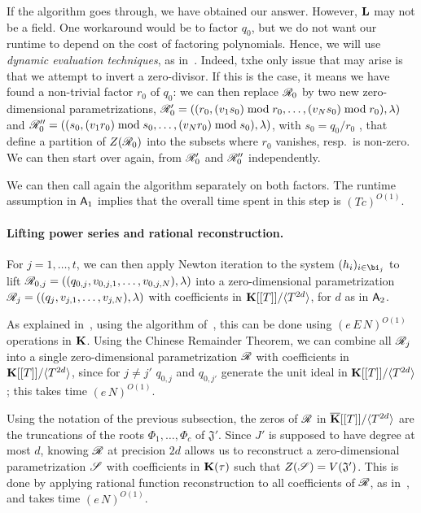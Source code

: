 \documentclass[12pt]{article}
\begin{document}
If the algorithm goes through, we have obtained our answer. However,
$\mathbf{L}$ may not be a field.  One workaround would be to factor $q_0$,
but we do not want our runtime to depend on the cost of factoring
polynomials. Hence, we will use {\em dynamic evaluation techniques},
as in~\cite{D5}. Indeed, txhe only issue that may arise is that we attempt to invert a
zero-divisor. If this is the case, it means we have found a
non-trivial factor $r_0$ of $q_0$: we can then replace $\mathscr{R}_0$ by
two new zero-dimensional parametrizations, $\mathscr{R}'_0=((r_0,(v_1 s_0)
\bmod r_0,\dots,(v_N s_0)\bmod r_0),\lambda)$ and $\mathscr{R}''_0=((s_0,(v_1 r_0)
\bmod s_0,\dots,(v_N r_0)\bmod s_0),\lambda)$, with $s_0=q_0/r_0$
, that define a partition of
$Z(\mathscr{R}_0)$ into the subsets where $r_0$ vanishes, resp.\ is
non-zero. We can then start over again, from $\mathscr{R}'_0$ and
$\mathscr{R}''_0$ independently.

We can then call again the algorithm separately on both factors. The
runtime assumption in ${\sf A}_1$ implies that the overall time spent
in this step is $(T c)^{O(1)}$.

\paragraph{Lifting power series and rational reconstruction.}
For $j=1,\dots,t$, we can then apply Newton iteration to the system
$(h_i)_{i \in \bi_j}$ to lift
$\mathscr{R}_{0,j}=((q_{0,j},v_{0,j,1},\dots,v_{0,j,N}),\lambda)$ into a
zero-dimensional parametrization
$\mathscr{R}_{j}=((q_{j},v_{j,1},\dots,v_{j,N}),\lambda)$ with coefficients
in $\mathbf{K}[[T]]/\langle T^{2d}\rangle$, for $d$ as in ${\sf A}_2$.

As explained in~\cite[Section~2.2]{SaSc16}, using the algorithm
of~\cite{GiLeSa01}, this can be done using $(e\,E\,N)^{O(1)}$
operations in $\mathbf{K}$. Using the Chinese Remainder Theorem, we can
combine all $\mathscr{R}_{j}$ into a single zero-dimensional parametrization
$\mathscr{R}$ with coefficients in $\mathbf{K}[[T]]/\langle T^{2d}\rangle$,
since for $j\ne j'$ $q_{0,j}$ and $q_{0,j'}$ generate the unit ideal
in $\mathbf{K}[[T]]/\langle T^{2d}\rangle$; this takes time
$(e\,N)^{O(1)}$.

Using the notation of the previous subsection, the zeros of $\mathscr{R}$ in
$\overline{\mathbf{K}}[[T]]/\langle T^{2d}\rangle$ are the truncations of the
roots $\Phi_1,\dots,\Phi_c$ of $\mathfrak{J}'$. Since $J'$ is supposed
to have degree at most $d$, knowing $\mathscr{R}$ at precision $2d$ allows
us to reconstruct a zero-dimensional parametrization $\mathscr{S}$ with
coefficients in $\mathbf{K}(\tau)$ such that $Z(\mathscr{S})=V(\mathfrak{J}')$.
This is done by applying rational function reconstruction to all
coefficients of $\mathscr{R}$, as in~\cite{Schost03}, and takes time
$(e\,N)^{O(1)}$.
\end{document}
